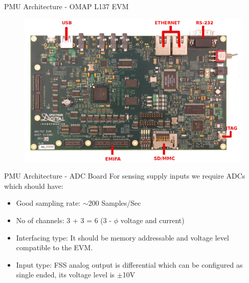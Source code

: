 \documentclass{beamer}
\begin{document}
\begin{frame}{PMU Architecture - OMAP L137 EVM}
\begin{figure}
\includegraphics[width=\textwidth]{fig/omapl137-evm-board.jpg}
\end{figure}
\end{frame}


\begin{frame}{PMU Architecture - ADC Board}
For sensing supply inputs we require ADCs which should have:
\begin{itemize}
\item Good sampling rate: $\sim$200 Samples/Sec
\item No of channels: 3 + 3 = 6 (3 - $\phi$ voltage and current) 
\item Interfacing type: It should be memory addressable and voltage level compatible  to the EVM.
\item Input type: FSS analog output is differential which can be configured as single ended, its voltage level is $\pm$10V
\end{itemize}
\end{frame}
\end{document}
